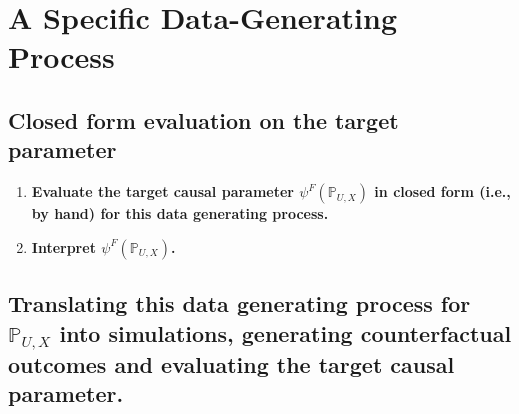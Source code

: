 \documentclass{article}\usepackage[]{graphicx}\usepackage[]{xcolor}
\begin{document}
\pagebreak

\section{A Specific Data-Generating Process}

  \subsection{Closed form evaluation on the target parameter}
  
    \begin{enumerate}[label=\textbf{\arabic*.}]
    
      \item \textbf{Evaluate the target causal parameter $\psi^F(\mathbb{P}_{U,X})$ in closed form (i.e., by hand) for this data generating process.}
      
      \item \textbf{Interpret $\psi^F(\mathbb{P}_{U,X})$.}
  
    \end{enumerate}
    
  \subsection{Translating this data generating process for $\mathbb{P}_{U,X}$ into simulations, generating counterfactual outcomes and evaluating the target causal parameter.}
  
\end{document}
